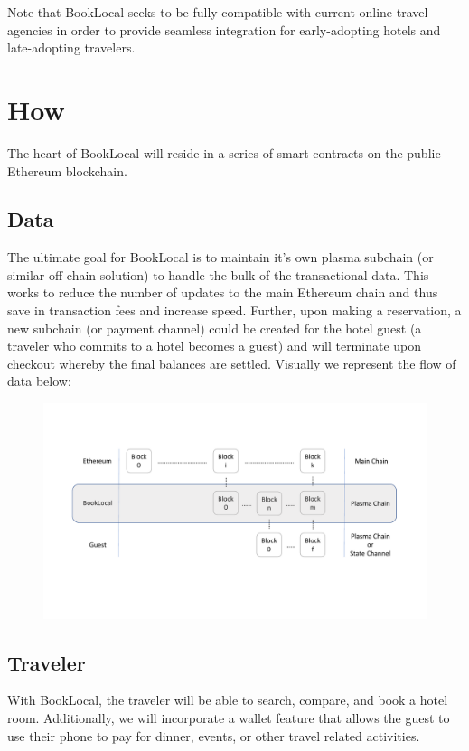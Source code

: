 \documentclass{article}
\begin{document}
\begin{flushleft}
Note that BookLocal seeks to be fully compatible with current online travel agencies in order to provide seamless integration for early-adopting hotels and late-adopting travelers.
\end{flushleft}



\newpage
\section{How}
The heart of BookLocal will reside in a series of smart contracts on the public Ethereum blockchain. 
\subsection{Data}
The ultimate goal for BookLocal is to maintain it's own plasma subchain (or similar off-chain solution) to handle the bulk of the transactional data. This works to reduce the number of updates to the main Ethereum chain and thus save in transaction fees and increase speed. Further, upon making a reservation, a new subchain (or payment channel) could be created for the hotel guest (a traveler who commits to a hotel becomes a guest) and will terminate upon checkout whereby the final balances are settled. Visually we represent the flow of data below:

\begin{figure}[H]
\centering
\includegraphics[width = \textwidth]{bookLocal_dataLayers.pdf}
\end{figure}

\subsection{Traveler}
With BookLocal, the traveler will be able to search, compare, and book a hotel room. Additionally, we will incorporate a wallet feature that allows the guest to use their phone to pay for dinner, events, or other travel related activities.  
\end{document}
